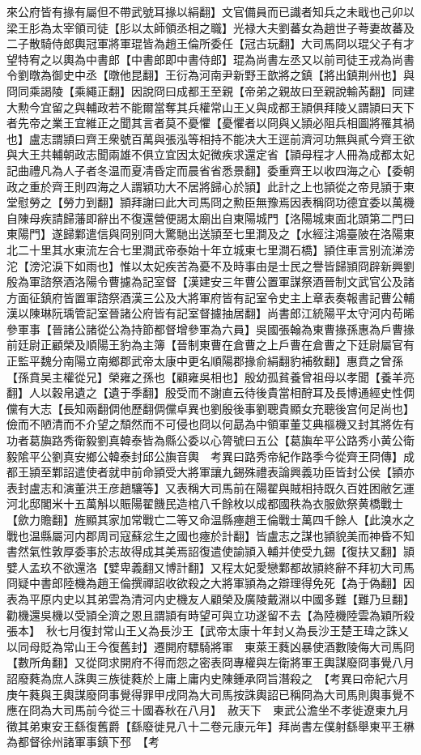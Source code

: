 來公府皆有掾有屬但不帶武號耳掾以絹翻】文官備員而已識者知兵之未戢也己卯以梁王肜為太宰領司徒【肜以太師領丞相之職】光禄大夫劉蕃女為趙世子荂妻故蕃及二子散騎侍郎輿冠軍將軍琨皆為趙王倫所委任【冠古玩翻】大司馬冏以琨父子有才望特宥之以輿為中書郎【中書郎即中書侍郎】琨為尚書左丞又以前司徒王戎為尚書令劉暾為御史中丞【暾他昆翻】王衍為河南尹新野王歆將之鎮【將出鎮荆州也】與冏同乘謁陵【乘繩正翻】因說冏曰成都王至親【帝弟之親故曰至親說輸芮翻】同建大勲今宜留之與輔政若不能爾當奪其兵權常山王乂與成都王頴俱拜陵乂謂頴曰天下者先帝之業王宜維正之聞其言者莫不憂懼【憂懼者以冏與乂頴必阻兵相圖將罹其禍也】盧志謂頴曰齊王衆號百萬與張泓等相持不能决大王逕前濟河功無與貳今齊王欲與大王共輔朝政志聞兩雄不俱立宜因太妃微疾求還定省【頴母程才人冊為成都太妃記曲禮凡為人子者冬温而夏凊昏定而晨省省悉景翻】委重齊王以收四海之心【委朝政之重於齊王則四海之人謂穎功大不居將歸心於頴】此計之上也頴從之帝見頴于東堂慰勞之【勞力到翻】頴拜謝曰此大司馬冏之勲臣無豫焉因表稱冏功德宜委以萬機自陳母疾請歸藩即辭出不復還營便謁太廟出自東陽城門【洛陽城東面北頭第二門曰東陽門】遂歸鄴遣信與冏别冏大驚馳出送頴至七里澗及之【水經注鴻臺陂在洛陽東北二十里其水東流左合七里澗武帝泰始十年立城東七里澗石橋】頴住車言别流涕滂沱【滂沱淚下如雨也】惟以太妃疾苦為憂不及時事由是士民之譽皆歸頴冏辟新興劉殷為軍諮祭酒洛陽令曹攄為記室督【漢建安三年曹公置軍謀祭酒晉制文武官公及諸方面征鎮府皆置軍諮祭酒漢三公及大將軍府皆有記室令史主上章表奏報書記曹公輔漢以陳琳阮瑀管記室晉諸公府皆有記室督攄抽居翻】尚書郎江統陽平太守河内苟晞參軍事【晉諸公諸從公為持節都督增參軍為六員】吳國張翰為東曹掾孫惠為戶曹掾前廷尉正顧榮及順陽王豹為主簿【晉制東曹在倉曹之上戶曹在倉曹之下廷尉屬官有正監平魏分南陽立南鄉郡武帝太康中更名順陽郡掾俞絹翻豹補敎翻】惠賁之曾孫【孫賁吴主權從兄】榮雍之孫也【顧雍吳相也】殷幼孤貧養曾祖母以孝聞【養羊亮翻】人以穀帛遺之【遺于季翻】殷受而不謝直云待後貴當相酧耳及長博通經史性倜儻有大志【長知兩翻倜他歷翻倜儻卓異也劉殷後事劉聰貴顯女充聰後宫何足尚也】儉而不陋清而不介望之頹然而不可侵也冏以何勗為中領軍董艾典樞機又封其將佐有功者葛旟路秀衛毅劉真韓泰皆為縣公委以心膂號曰五公【葛旟牟平公路秀小黄公衛毅隂平公劉真安鄉公韓泰封邱公旟音輿　考異曰路秀帝紀作路季今從齊王冏傳】成都王頴至鄴詔遣使者就申前命頴受大將軍讓九錫殊禮表論興義功臣皆封公侯【頴亦表封盧志和演董洪王彦趙驤等】又表稱大司馬前在陽翟與賊相持既久百姓困敝乞運河北邸閣米十五萬斛以賑陽翟饑民造棺八千餘枚以成都國秩為衣服歛祭黄橋戰士【歛力贍翻】旌顯其家加常戰亡二等又命温縣瘞趙王倫戰士萬四千餘人【此溴水之戰也温縣屬河内郡周司寇蘇忿生之國也瘞於計翻】皆盧志之謀也頴貌美而神昏不知書然氣性敦厚委事於志故得成其美焉詔復遣使諭頴入輔并使受九錫【復扶又翻】頴嬖人孟玖不欲還洛【嬖卑義翻又博計翻】又程太妃愛戀鄴都故頴終辭不拜初大司馬冏疑中書郎陸機為趙王倫撰禪詔收欲殺之大將軍頴為之辯理得免死【為于偽翻】因表為平原内史以其弟雲為清河内史機友人顧榮及廣陵戴淵以中國多難【難乃旦翻】勸機還吳機以受頴全濟之恩且謂頴有時望可與立功遂留不去【為陸機陸雲為穎所殺張本】　秋七月復封常山王乂為長沙王【武帝太康十年封乂為長沙王楚王瑋之誅乂以同母貶為常山王今復舊封】遷開府驃騎將軍　東萊王蕤凶暴使酒數陵侮大司馬冏【數所角翻】又從冏求開府不得而怨之密表冏專權與左衛將軍王輿謀廢冏事覺八月詔廢蕤為庶人誅輿三族徙蕤於上庸上庸内史陳鍾承冏旨潛殺之　【考異曰帝紀六月庚午蕤與王輿謀廢冏事覺得罪甲戌冏為大司馬按誅輿詔已稱冏為大司馬則輿事覺不應在冏為大司馬前今從三十國春秋在八月】　赦天下　東武公澹坐不孝徙遼東九月徵其弟東安王繇復舊爵【繇廢徙見八十二卷元康元年】拜尚書左僕射繇舉東平王楙為都督徐州諸軍事鎮下邳　【考